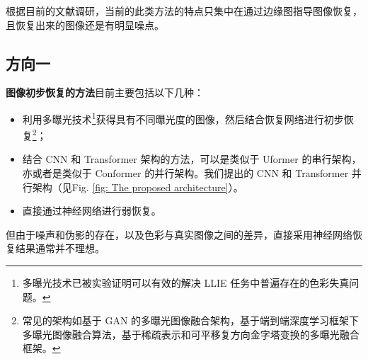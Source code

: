 \documentclass[a4paper]{ctexart}
\begin{document}
	根据目前的文献调研，当前的此类方法的特点只集中在通过边缘图指导图像恢复，且恢复出来的图像还是有明显噪点。
	
	\subsection{方向一}
	
	\textbf{图像初步恢复的方法}目前主要包括以下几种：
	
	\begin{itemize}
		\item[(1)] 
		利用多曝光技术\footnote{多曝光技术已被实验证明可以有效的解决 LLIE 任务中普遍存在的色彩失真问题。}获得具有不同曝光度的图像，然后结合恢复网络进行初步恢复\footnote{常见的架构如基于 GAN 的多曝光图像融合架构，基于端到端深度学习框架下多曝光图像融合算法，基于稀疏表示和可平移复方向金字塔变换的多曝光融合框架。}；
		
		\item[(2)]
		结合 CNN 和 Transformer 架构的方法，可以是类似于 Uformer \cite{wang2022uformer}的串行架构，亦或者是类似于 Conformer 的并行架构。我们提出的 CNN 和 Transformer 并行架构（见Fig. \ref{fig: The proposed architecture}）。
		
		\item[(3)]
		直接通过神经网络进行弱恢复。
		
	\end{itemize}	
	
	但由于噪声和伪影的存在，以及色彩与真实图像之间的差异，直接采用神经网络恢复结果通常并不理想。
	
\end{document}
